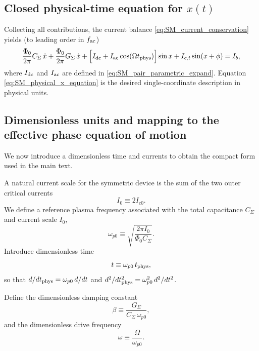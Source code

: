 \documentclass[prl,twocolumn,superscriptaddress,showpacs,nofootinbib]{revtex4-2}
\begin{document}
\subsection{Closed physical-time equation for $x(t)$}
\label{sec:SM_physical_equation}
Collecting all contributions, the current balance \eqref{eq:SM_current_conservation}
yields (to leading order in $f_{\rm ac}$)
\begin{align}
\frac{\Phi_0}{2\pi}C_\Sigma\,\ddot x
+\frac{\Phi_0}{2\pi}G_\Sigma\,\dot x
+\Big[I_{\rm dc}+I_{\rm ac}\cos(\Omega t_{\rm phys})\Big]\sin x
+I_{c,t}\sin(x+\phi)
= I_b,
\label{eq:SM_physical_x_equation}
\end{align}
where $I_{\rm dc}$ and $I_{\rm ac}$ are defined in \eqref{eq:SM_pair_parametric_expand}.
Equation \eqref{eq:SM_physical_x_equation} is the desired single-coordinate
description in physical units.

\subsection{Dimensionless units and mapping to the effective phase equation of motion}
\label{sec:SM_nondim}
We now introduce a dimensionless time and currents to obtain the compact form used in the main text.


A natural current scale for the symmetric device is the sum of the two outer critical currents
\begin{equation}
I_0 \equiv 2I_{c0}.
\label{eq:SM_I0_def}
\end{equation}
We define a reference plasma frequency associated with the total capacitance $C_\Sigma$ and current scale $I_0$,
\begin{equation}
\omega_{p0}\equiv \sqrt{\frac{2\pi I_0}{\Phi_0 C_\Sigma}}.
\label{eq:SM_omega_p0}
\end{equation}
Introduce dimensionless time
\begin{equation}
t \equiv \omega_{p0}\,t_{\rm phys},
\label{eq:SM_dimless_time}
\end{equation}
so that $d/dt_{\rm phys}=\omega_{p0}\,d/dt$ and $d^2/dt_{\rm phys}^2=\omega_{p0}^2\,d^2/dt^2$.

Define the dimensionless damping constant
\begin{equation}
\beta \equiv \frac{G_\Sigma}{C_\Sigma\,\omega_{p0}},
\label{eq:SM_beta_def}
\end{equation}
and the dimensionless drive frequency
\begin{equation}
\omega \equiv \frac{\Omega}{\omega_{p0}}.
\label{eq:SM_omega_def}
\end{equation}
\end{document}
